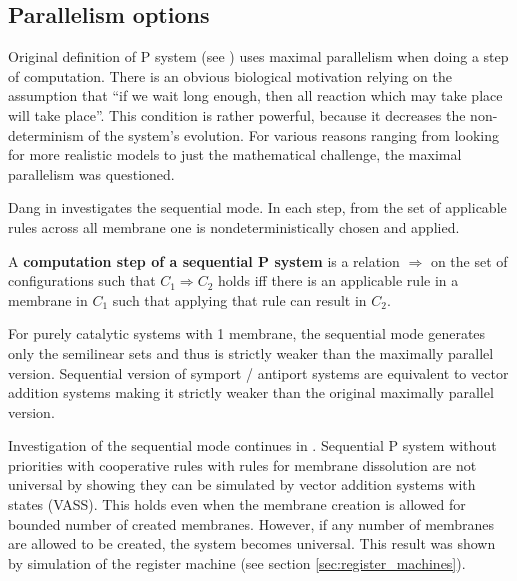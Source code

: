 
\subsection{Parallelism options} %
\label{sub:parallelism_options}

Original definition of P system (see \cite{Paun98}) uses  maximal parallelism when doing a step of computation. There is an obvious biological motivation relying on the assumption that ``if we wait long enough, then all reaction which may take place will take place''. This condition is rather powerful, because it decreases the non-determinism of the system's evolution. For various reasons ranging from looking for more realistic models to just the mathematical challenge, the maximal parallelism was questioned.


Dang in \cite{Dang04Sequential} investigates the  sequential mode. In each step, from the set of applicable rules across all membrane one is nondeterministically chosen and applied.

\begin{definition}
  \label{def:computation_step_of_a_sequential_P_system}
  A {\bf computation step of a sequential P system} is a relation $\Rightarrow$ on the set of configurations such that $C_1 \Rightarrow C_2$ holds iff there is an applicable rule in a membrane in $C_1$ such that applying that rule can result in $C_2$.
\end{definition}

For purely catalytic systems with 1 membrane, the sequential mode generates only the semilinear sets and thus is strictly weaker than the maximally parallel version.
Sequential version of symport / antiport systems are equivalent to vector addition systems making it strictly weaker than the original maximally parallel version.

Investigation of the sequential mode continues in \cite{Ibarra05Active}. Sequential P system without priorities with cooperative rules with rules for membrane dissolution are not universal by showing they can be simulated by vector addition systems with states (VASS).
This holds even when the membrane creation is allowed for bounded number of created membranes. However, if any number of membranes are allowed to be created, the system becomes universal. This result was shown by simulation of the register machine (see section \ref{sec:register_machines}).

